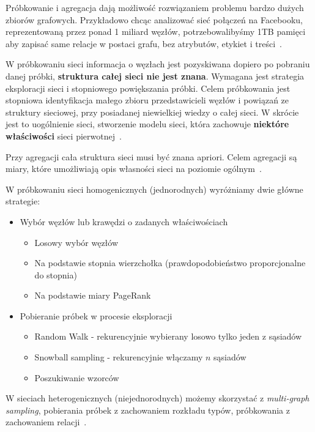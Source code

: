 \documentclass[wi]{zut}
\begin{document}
Próbkowanie i agregacja dają możliwość rozwiązaniem problemu bardzo dużych zbiorów grafowych. Przykładowo chcąc analizować sieć połączeń na Facebooku, reprezentowaną przez ponad 1 miliard węzłów, potrzebowalibyśmy 1TB pamięci aby zapisać same relacje w postaci grafu, bez atrybutów, etykiet i treści~\cite{Jankowski2020_probkowanie}. 

W próbkowaniu sieci informacja o węzłach jest pozyskiwana dopiero po pobraniu danej próbki, \textbf{struktura całej sieci nie jest znana}. Wymagana jest strategia eksploracji sieci i stopniowego powiększania próbki. Celem próbkowania jest stopniowa identyfikacja małego zbioru przedstawicieli węzłów i powiązań ze struktury sieciowej, przy posiadanej niewielkiej wiedzy o całej sieci. W skrócie jest to uogólnienie sieci, stworzenie modelu sieci, która zachowuje \textbf{niektóre właściwości} sieci pierwotnej~\cite{Jankowski2020_probkowanie}. 

Przy agregacji cała struktura sieci musi być znana apriori. Celem agregacji są miary, które umożliwiają opis własności sieci na poziomie ogólnym~\cite{Jankowski2020_probkowanie}. 

W próbkowaniu sieci homogenicznych (jednorodnych) wyróżniamy dwie główne strategie:

\begin{itemize}
    \item Wybór węzłów lub krawędzi o zadanych właściwościach
    \begin{itemize}
        \item Losowy wybór węzłów
        \item Na podstawie stopnia wierzchołka (prawdopodobieństwo proporcjonalne do stopnia)
        \item Na podstawie miary PageRank
    \end{itemize}
    \item Pobieranie próbek w procesie eksploracji
    \begin{itemize}
        \item Random Walk - rekurencyjnie wybierany losowo tylko jeden z sąsiadów
        \item Snowball sampling - rekurencyjnie włączamy $n$ sąsiadów
        \item Poszukiwanie wzorców
    \end{itemize}
\end{itemize}

W sieciach heterogenicznych (niejednorodnych) możemy skorzystać z \emph{multi-graph sampling}, pobierania próbek z zachowaniem rozkładu typów, próbkowania z zachowaniem relacji~\cite{Jankowski2020_probkowanie}.
\end{document}
